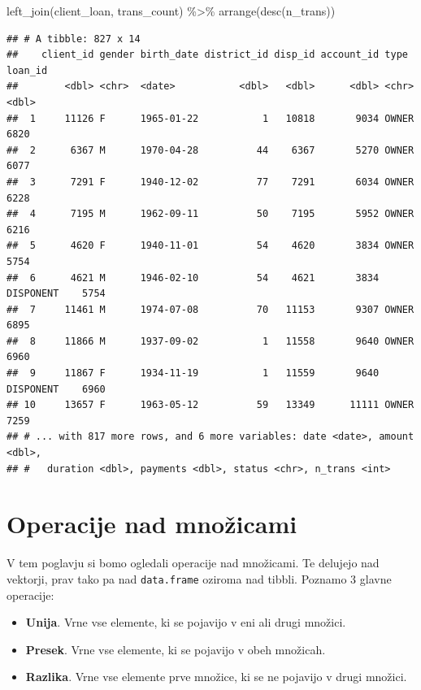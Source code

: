 \documentclass[
]{book}
\newenvironment{Shaded}{\begin{snugshade}}{\end{snugshade}}
\newcommand{\FunctionTok}[1]{\textcolor[rgb]{0.00,0.00,0.00}{#1}}
\newcommand{\NormalTok}[1]{#1}
\newcommand{\SpecialCharTok}[1]{\textcolor[rgb]{0.00,0.00,0.00}{#1}}
\providecommand{\tightlist}{%
  \setlength{\itemsep}{0pt}\setlength{\parskip}{0pt}}
\begin{document}
\begin{Shaded}
\begin{Highlighting}[]
\FunctionTok{left\_join}\NormalTok{(client\_loan, trans\_count) }\SpecialCharTok{\%\textgreater{}\%}
  \FunctionTok{arrange}\NormalTok{(}\FunctionTok{desc}\NormalTok{(n\_trans))}
\end{Highlighting}
\end{Shaded}

\begin{verbatim}
## # A tibble: 827 x 14
##    client_id gender birth_date district_id disp_id account_id type      loan_id
##        <dbl> <chr>  <date>           <dbl>   <dbl>      <dbl> <chr>       <dbl>
##  1     11126 F      1965-01-22           1   10818       9034 OWNER        6820
##  2      6367 M      1970-04-28          44    6367       5270 OWNER        6077
##  3      7291 F      1940-12-02          77    7291       6034 OWNER        6228
##  4      7195 M      1962-09-11          50    7195       5952 OWNER        6216
##  5      4620 F      1940-11-01          54    4620       3834 OWNER        5754
##  6      4621 M      1946-02-10          54    4621       3834 DISPONENT    5754
##  7     11461 M      1974-07-08          70   11153       9307 OWNER        6895
##  8     11866 M      1937-09-02           1   11558       9640 OWNER        6960
##  9     11867 F      1934-11-19           1   11559       9640 DISPONENT    6960
## 10     13657 F      1963-05-12          59   13349      11111 OWNER        7259
## # ... with 817 more rows, and 6 more variables: date <date>, amount <dbl>,
## #   duration <dbl>, payments <dbl>, status <chr>, n_trans <int>
\end{verbatim}

\hypertarget{operacije-nad-mnoux17eicami}{%
\section{Operacije nad množicami}\label{operacije-nad-mnoux17eicami}}

V tem poglavju si bomo ogledali operacije nad množicami. Te delujejo nad vektorji, prav tako pa nad \texttt{data.frame} oziroma nad tibbli. Poznamo 3 glavne operacije:

\begin{itemize}
\tightlist
\item
  \textbf{Unija}. Vrne vse elemente, ki se pojavijo v eni ali drugi množici.
\item
  \textbf{Presek}. Vrne vse elemente, ki se pojavijo v obeh množicah.
\item
  \textbf{Razlika}. Vrne vse elemente prve množice, ki se ne pojavijo v drugi množici.
\end{itemize}
\end{document}
